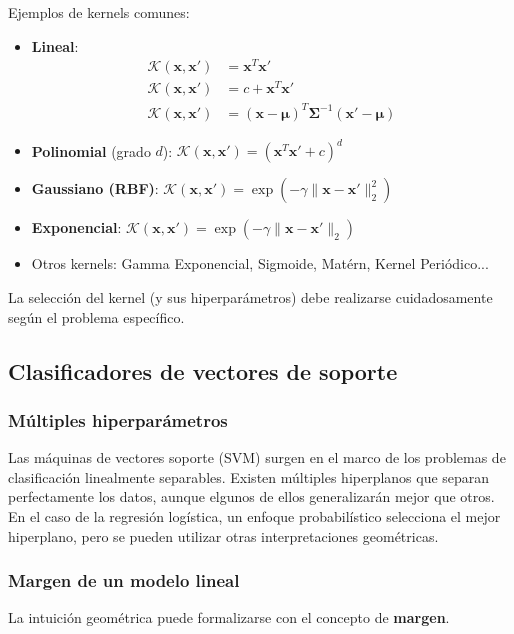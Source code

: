 Ejemplos de kernels comunes:
\begin{itemize}
    \item \textbf{Lineal}:
    \begin{align*}
        \mathcal{K}(\mathbf{x}, \mathbf{x}') &= \mathbf{x}^T\mathbf{x}' \\
        \mathcal{K}(\mathbf{x}, \mathbf{x}') &= c + \mathbf{x}^T\mathbf{x}' \\
        \mathcal{K}(\mathbf{x}, \mathbf{x}') &= (\mathbf{x} - \boldsymbol{\mu})^T\boldsymbol{\Sigma}^{-1}(\mathbf{x}' - \boldsymbol{\mu})
    \end{align*}
    
    \item \textbf{Polinomial} (grado $d$): $ \mathcal{K}(\mathbf{x}, \mathbf{x}') = (\mathbf{x}^T\mathbf{x}' + c)^d $
    
    \item \textbf{Gaussiano (RBF)}:
    $ \mathcal{K}(\mathbf{x}, \mathbf{x}') = \exp\left(-\gamma\|\mathbf{x} - \mathbf{x}'\|_2^2\right) $
    
    \item \textbf{Exponencial}:
    $ \mathcal{K}(\mathbf{x}, \mathbf{x}') = \exp\left(-\gamma\|\mathbf{x} - \mathbf{x}'\|_2\right) $
    
    \item Otros kernels: Gamma Exponencial, Sigmoide, Matérn, Kernel Periódico...
\end{itemize}

La selección del kernel (y sus hiperparámetros) debe realizarse cuidadosamente según el problema específico.

\subsection{Clasificadores de vectores de soporte}
\subsubsection{Múltiples hiperparámetros}
Las máquinas de vectores soporte (SVM) surgen en el marco de los problemas de clasificación linealmente separables. Existen múltiples hiperplanos que separan perfectamente los datos, aunque elgunos de ellos generalizarán mejor que otros.
En el caso de la regresión logística, un enfoque probabilístico selecciona el mejor hiperplano, pero se pueden utilizar otras interpretaciones geométricas.

\subsubsection{Margen de un modelo lineal}
La intuición geométrica puede formalizarse con el concepto de \textbf{margen}.

